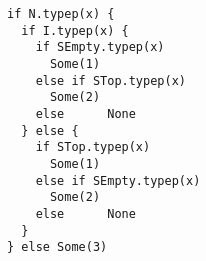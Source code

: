\begin{lstlisting}[style=scalaioScala]
if N.typep(x) {
  if I.typep(x) {
    if SEmpty.typep(x)
      Some(1)
    else if STop.typep(x)
      Some(2)
    else      None
  } else {
    if STop.typep(x)
      Some(1)
    else if SEmpty.typep(x)
      Some(2)
    else      None
  }
} else Some(3)
\end{lstlisting}
